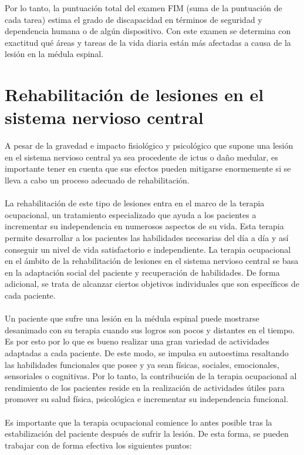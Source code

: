 Por lo tanto, la puntuación total del examen FIM (suma de la puntuación de cada tarea) estima el grado de discapacidad en términos de seguridad y dependencia humana o de algún dispositivo. Con este examen se determina con exactitud qué áreas y tareas de la vida diaria están más afectadas a causa de la lesión en la médula espinal. 





\section{Rehabilitación de lesiones en el sistema nervioso central}
A pesar de la gravedad e impacto fisiológico y psicológico que supone una lesión en el sistema nervioso central ya sea procedente de ictus o daño medular, es importante tener en cuenta que sus efectos pueden mitigarse enormemente si se lleva a cabo un proceso adecuado de rehabilitación.
\\
\\
La rehabilitación de este tipo de lesiones entra en el marco de la terapia ocupacional, un tratamiento especializado que ayuda a los pacientes a incrementar su independencia en numerosos aspectos de su vida. Esta terapia permite desarrollar a los pacientes las habilidades necesarias del día a día y así conseguir un nivel de vida satisfactorio e independiente. La terapia ocupacional en el ámbito de la rehabilitación de lesiones en el sistema nervioso central se basa en la adaptación social del paciente y recuperación de habilidades. De forma adicional, se trata de alcanzar ciertos objetivos individuales que son específicos de cada paciente\cite{rehabilitacion}.
\\
\\
Un paciente que sufre una lesión en la médula espinal puede mostrarse desanimado con su terapia cuando sus logros son pocos y distantes en el tiempo. Es por esto por lo que es bueno realizar una gran variedad de actividades adaptadas a cada paciente. De este modo, se impulsa su autoestima resaltando las habilidades funcionales que posee y ya sean físicas, sociales, emocionales, sensoriales o cognitivas. Por lo tanto, la contribución de la terapia ocupacional al rendimiento de los pacientes reside en la realización de actividades útiles para promover su salud física, psicológica e incrementar su independencia funcional.
\\
\\
Es importante que la terapia ocupacional comience lo antes posible tras la estabilización del paciente después de sufrir la lesión. De esta forma, se pueden trabajar con de forma efectiva los siguientes puntos:

